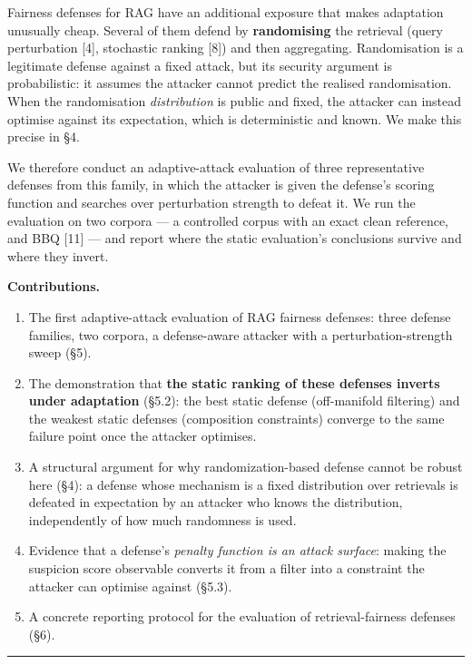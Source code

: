 \documentclass[review,3p,times]{elsarticle}
\providecommand{\tightlist}{%
  \setlength{\itemsep}{0pt}\setlength{\parskip}{0pt}}
\begin{document}
Fairness defenses for RAG have an additional exposure that makes adaptation unusually cheap. Several of them defend by \textbf{randomising} the retrieval (query perturbation {[}4{]}, stochastic ranking {[}8{]}) and then aggregating. Randomisation is a legitimate defense against a fixed attack, but its security argument is probabilistic: it assumes the attacker cannot predict the realised randomisation. When the randomisation \emph{distribution} is public and fixed, the attacker can instead optimise against its expectation, which is deterministic and known. We make this precise in §4.

We therefore conduct an adaptive-attack evaluation of three representative defenses from this family, in which the attacker is given the defense's scoring function and searches over perturbation strength to defeat it. We run the evaluation on two corpora --- a controlled corpus with an exact clean reference, and BBQ {[}11{]} --- and report where the static evaluation's conclusions survive and where they invert.

\textbf{Contributions.}

\begin{enumerate}
\def\labelenumi{\arabic{enumi}.}
\tightlist
\item
  The first adaptive-attack evaluation of RAG fairness defenses: three defense families, two corpora, a defense-aware attacker with a perturbation-strength sweep (§5).
\item
  The demonstration that \textbf{the static ranking of these defenses inverts under adaptation} (§5.2): the best static defense (off-manifold filtering) and the weakest static defenses (composition constraints) converge to the same failure point once the attacker optimises.
\item
  A structural argument for why randomization-based defense cannot be robust here (§4): a defense whose mechanism is a fixed distribution over retrievals is defeated in expectation by an attacker who knows the distribution, independently of how much randomness is used.
\item
  Evidence that a defense's \emph{penalty function is an attack surface}: making the suspicion score observable converts it from a filter into a constraint the attacker can optimise against (§5.3).
\item
  A concrete reporting protocol for the evaluation of retrieval-fairness defenses (§6).
\end{enumerate}

\begin{center}\rule{0.5\linewidth}{0.5pt}\end{center}
\end{document}
